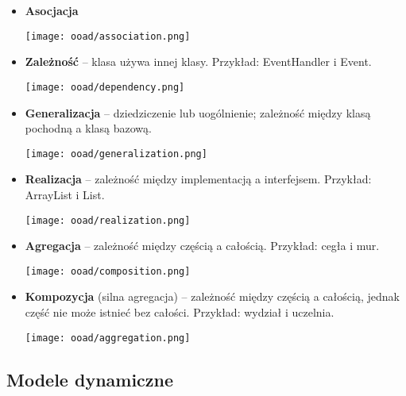 \documentclass[main.tex]{subfiles}
\begin{document}
    \begin{itemize}[noitemsep]
        \item \textbf{Asocjacja}

        \begin{center}
            \texttt{[image: ooad/association.png]}
        \end{center}

        \item \textbf{Zależność} -- klasa używa innej klasy. Przykład: EventHandler i Event.
        \begin{center}
            \texttt{[image: ooad/dependency.png]}
        \end{center}

        \item \textbf{Generalizacja} -- dziedziczenie lub uogólnienie; zależność między klasą pochodną a klasą bazową.
        \begin{center}
            \texttt{[image: ooad/generalization.png]}
        \end{center}

        \item \textbf{Realizacja} -- zależność między implementacją a interfejsem. Przykład: ArrayList i List.

        \begin{center}
            \texttt{[image: ooad/realization.png]}
        \end{center}

        \item \textbf{Agregacja} -- zależność między częścią a całością. Przykład: cegła i mur.

        \begin{center}
            \texttt{[image: ooad/composition.png]}
        \end{center}

        \item \textbf{Kompozycja} (silna agregacja) -- zależność między częścią a całością, jednak część nie może
        istnieć bez całości. Przykład: wydział i uczelnia.

        \begin{center}
            \texttt{[image: ooad/aggregation.png]}
        \end{center}
    \end{itemize}

    \subsection{Modele dynamiczne}
\end{document}
